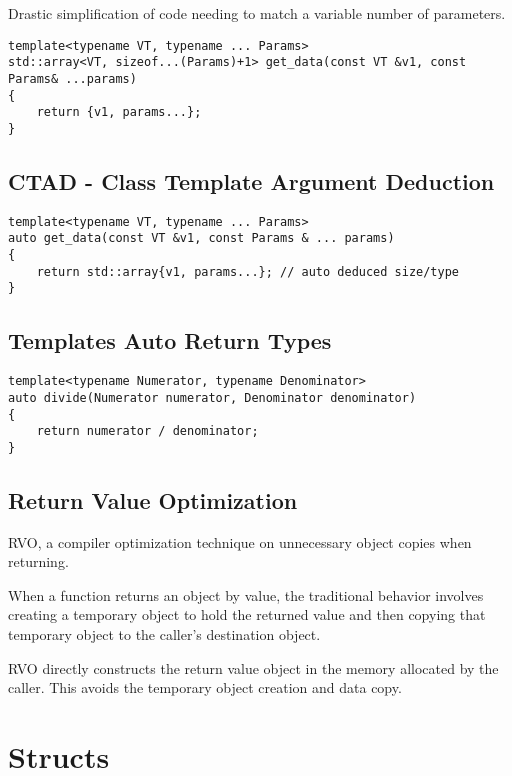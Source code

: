 Drastic simplification of code needing to match a variable number of parameters.

\begin{verbatim}
template<typename VT, typename ... Params>
std::array<VT, sizeof...(Params)+1> get_data(const VT &v1, const Params& ...params)
{
    return {v1, params...};
}
\end{verbatim}

\subsection{CTAD - Class Template Argument Deduction}

\begin{verbatim}
template<typename VT, typename ... Params>
auto get_data(const VT &v1, const Params & ... params)
{
    return std::array{v1, params...}; // auto deduced size/type
}
\end{verbatim}

\subsection{Templates Auto Return Types}

\begin{verbatim}
template<typename Numerator, typename Denominator>
auto divide(Numerator numerator, Denominator denominator)
{
    return numerator / denominator;
}
\end{verbatim}


\subsection{Return Value Optimization}
RVO, a compiler optimization technique on 
unnecessary object copies when returning.


When a function returns an object by value,
the traditional behavior involves creating a temporary object to hold 
the returned value and then copying that temporary object to the caller's destination object.


RVO directly constructs the return value object in the memory allocated by the caller.
This avoids the temporary object creation and data copy.

\section{Structs}

